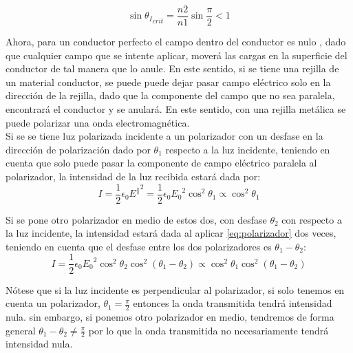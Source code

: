 \documentclass[%
 reprint,
 amsmath,amssymb,
 aps,
]{revtex4-1}
\begin{document}
\begin{equation}
	\sin{{\theta_I}_{crit}} = \frac{n2}{n1}\sin{\frac{\pi}{2}} < 1
\label{eq:rit}
\end{equation}

Ahora, para un conductor perfecto el campo dentro del conductor es nulo \cite{Griffiths}, dado que cualquier campo que se intente aplicar, moverá las cargas en la superficie del conductor de tal manera que lo anule. En este sentido, si se tiene una rejilla de un material conductor, se puede puede dejar pasar campo eléctrico solo en la dirección de la rejilla, dado que la componente del campo que no sea paralela, encontrará el conductor y se anulará. En este sentido, con una rejilla metálica se puede polarizar una onda electromagnética.\\

Si se se tiene luz polarizada incidente a un polarizador con un desfase en la dirección de polarización dado por $\theta_1$ respecto a la luz incidente, teniendo en cuenta que solo puede pasar la componente de campo eléctrico paralela al polarizador, la intensidad de la luz recibida estará dada por:\\

\begin{equation}
I = \frac{1}{2}\epsilon_0{E^{\parallel}}^2 = \frac{1}{2}\epsilon_0{E_0}^2{\cos^2{\theta_1}} \propto \cos^2{\theta_1}
\label{eq:polarizador}
\end{equation}

Si se pone otro polarizador en medio de estos dos, con desfase $\theta_2$ con respecto a la luz incidente, la intensidad estará dada al aplicar \ref{eq:polarizador} dos veces, teniendo en cuenta que el desfase entre los dos polarizadores es $\theta_1-\theta_2$:\\

\begin{equation}
I = \frac{1}{2}\epsilon_0{E_0}^2{\cos^2{\theta_2}}\cos^2{ \left( \theta_1-\theta_2 \right) } \propto \cos^2{ \theta_1}\cos^2{ \left( \theta_1-\theta_2 \right) }
\label{eq:polarizador2}
\end{equation}

Nótese que si la luz incidente es perpendicular al polarizador, si solo tenemos en cuenta un polarizador, $\theta_1 = \frac{\pi}{2}$ entonces la onda transmitida tendrá intensidad nula. sin embargo, si ponemos otro polarizador en medio, tendremos de forma general $\theta_1 - \theta_2 \neq \frac{\pi}{2}$ por lo que la onda transmitida no necesariamente tendrá intensidad nula.\\
\end{document}
